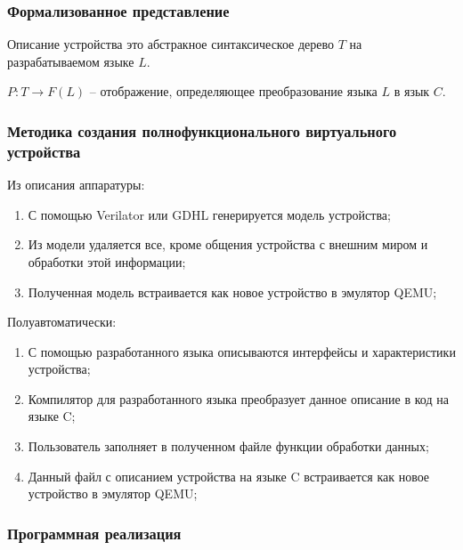 \begin{frame}%
    \frametitle{Формализованное представление}
    Описание устройства это абстракное синтаксическое дерево $T$ на разрабатываемом языке $L$.

    $P \colon T \to F(L)$ -- отображение, определяющее преобразование языка $L$ в язык $C$.
\end{frame}


\begin{frame}%
    \frametitle{Методика создания полнофункционального виртуального устройства}
    Из описания аппаратуры:
    \begin{enumerate}
        \item С помощью Verilator или GDHL генерируется модель устройства;
        \item Из модели удаляется все, кроме общения устройства с внешним миром и обработки этой информации;
        \item Полученная модель встраивается как новое устройство в эмулятор QEMU;
    \end{enumerate}
    Полуавтоматически:
    \begin{enumerate}
        \item С помощью разработанного языка описываются интерфейсы и характеристики устройства;
        \item Компилятор для разработанного языка преобразует данное описание в код на языке C;
        \item Пользователь заполняет в полученном файле функции обработки данных;
        \item Данный файл с описанием устройства на языке C встраивается как новое устройство в эмулятор QEMU;
    \end{enumerate}
\end{frame}


\begin{frame}%
    \frametitle{Программная реализация}
    
\end{frame}


